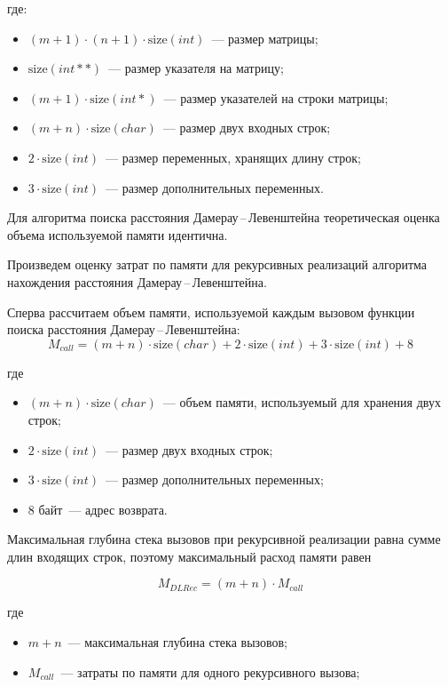 \noindent где:
\begin{itemize}
    \item $(m + 1) \cdot (n + 1) \cdot \text{size}(int)$~--- размер матрицы;
    \item $\text{size}(int**)$~--- размер указателя на матрицу;
    \item $(m + 1) \cdot \text{size}(int*)$~--- размер указателей на строки матрицы;
    \item $(m + n) \cdot \text{size}(char)$~--- размер двух входных строк;
    \item $2 \cdot \text{size}(int)$~--- размер переменных, хранящих длину строк;
    \item $3 \cdot \text{size}(int)$~--- размер дополнительных переменных.
\end{itemize}

Для алгоритма поиска расстояния Дамерау\,--\,Левенштейна теорети\-ческая оценка объема используемой памяти идентична.

Произведем оценку затрат по памяти для рекурсивных реализаций алгоритма нахождения расстояния Дамерау\,--\,Левенштейна.

Сперва рассчитаем объем памяти, используемой каждым вызовом функции поиска расстояния Дамерау\,--\,Левенштейна:
\begin{equation}
    M_{call} = (m + n) \cdot \text{size}(char) + 2 \cdot \text{size}(int) + 3 \cdot \text{size}(int) + 8
\end{equation}

\noindent где
\begin{itemize}
    \item $(m + n) \cdot \text{size}(char)$~--- объем памяти, используемый для хранения двух строк;
    \item $2 \cdot \text{size}(int)$~--- размер двух входных строк;
    \item $3 \cdot \text{size}(int)$~--- размер дополнительных переменных;
    \item 8 байт~--- адрес возврата.
\end{itemize}

Максимальная глубина стека вызовов при рекурсивной реализации равна сумме длин входящих строк, поэтому максимальный расход памяти равен

\begin{equation}
    M_{DLRec} = (m + n) \cdot M_{call}
\end{equation}

\noindent где

\begin{itemize}
    \item $m + n$~--- максимальная глубина стека вызовов;
    \item $M_{call}$~--- затраты по памяти для одного рекурсивного вызова;
\end{itemize}

